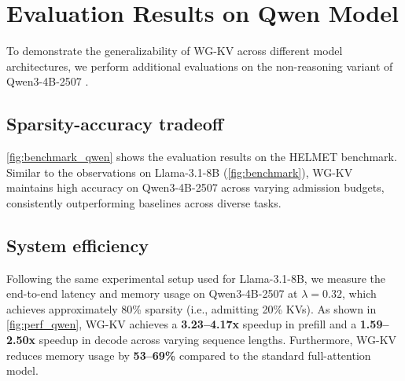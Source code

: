 \section{Evaluation Results on Qwen Model}
\label{app:qwen}

To demonstrate the generalizability of WG-KV across different model architectures, we perform additional evaluations on the non-reasoning variant of Qwen3-4B-2507 \cite{qwen3}.


\subsection{Sparsity-accuracy tradeoff}

\cref{fig:benchmark_qwen} shows the evaluation results on the HELMET benchmark. Similar to the observations on Llama-3.1-8B (\cref{fig:benchmark}), WG-KV maintains high accuracy on Qwen3-4B-2507 across varying admission budgets, consistently outperforming baselines across diverse tasks.

\subsection{System efficiency}

Following the same experimental setup used for Llama-3.1-8B, we measure the end-to-end latency and memory usage on Qwen3-4B-2507 at $\lambda=0.32$, which achieves approximately 80\% sparsity (i.e., admitting 20\% KVs). As shown in \cref{fig:perf_qwen}, WG-KV achieves a \textbf{3.23--4.17x} speedup in prefill and a \textbf{1.59--2.50x} speedup in decode across varying sequence lengths. Furthermore, WG-KV reduces memory usage by \textbf{53--69\%} compared to the standard full-attention model.

